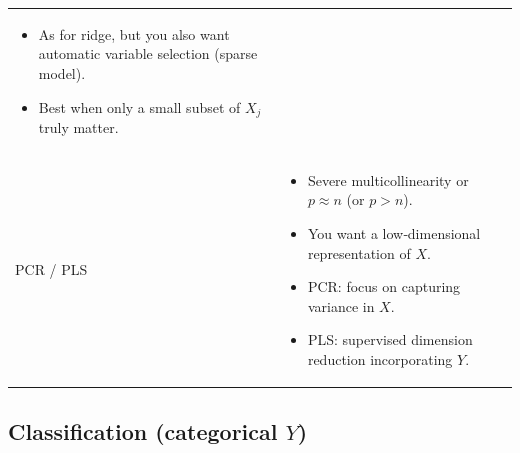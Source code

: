 \documentclass{article}
\begin{document}
\begin{tabular}{p{4cm} p{11cm}}
\begin{itemize}[nosep]
  \item As for ridge, but you also want automatic variable selection (sparse model).
  \item Best when only a small subset of \(X_j\) truly matter.
\end{itemize}
\\[8pt]
PCR / PLS &
\begin{itemize}[nosep]
  \item Severe multicollinearity or \(p\approx n\) (or \(p>n\)).
  \item You want a low‐dimensional representation of \(X\).
  \item PCR: focus on capturing variance in \(X\).  
  \item PLS: supervised dimension reduction incorporating \(Y\).
\end{itemize}
\end{tabular}

\bigskip
\subsection{Classification (categorical \(Y\))}
\end{document}
